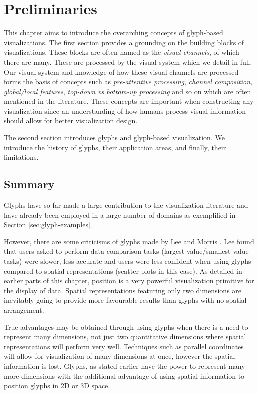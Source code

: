 \chapter{Preliminaries}
\label{chap:related_work}
This chapter aims to introduce the overarching concepts of glyph-based visualizations. 
The first section provides a grounding on the building blocks of visualizations. 
These blocks are often named as the \emph{visual channels}, of which there are many. 
These are processed by the visual system which we detail in full.
Our visual system and knowledge of how these visual channels are processed forms the basis of concepts such as \emph{pre-attentive processing}, \emph{channel composition}, \emph{global/local features}, \emph{top-down vs bottom-up processing} and so on which are often mentioned in the literature. 
These concepts are important when constructing any visualization since an understanding of how humans process visual information should allow for better visualization design.

The second section introduces glyphs and glyph-based visualization.
We introduce the history of glyphs, their application areas, and finally, their limitations.





\section{Summary}

Glyphs have so far made a large contribution to the visualization literature and have already been employed in a large number of domains as exemplified in Section \ref{sec:glyph-examples}. 

However, there are some criticisms of glyphs made by Lee \etal \cite{Lee03anempirical} and Morris \etal \cite{morris2000experimental}. 
Lee \etal found that users asked to perform data comparison tasks (largest value/smallest value tasks) were slower, less accurate and users were less confident when using glyphs compared to spatial representations (scatter plots in this case). 
As detailed in earlier parts of this chapter, position is a very powerful visualization primitive for the display of data. 
Spatial representations featuring only two dimensions are inevitably going to provide more favourable results than glyphs with no spatial arrangement.

True advantages may be obtained through using glyphs when there is a need to represent many dimensions, not just two quantitative dimensions where spatial representations will perform very well. 
Techniques such as parallel coordinates will allow for visualization of many dimensions at once, however the spatial information is lost.
Glyphs, as stated earlier have the power to represent many more dimensions with the additional advantage of using spatial information to position glyphs in 2D or 3D space.  

